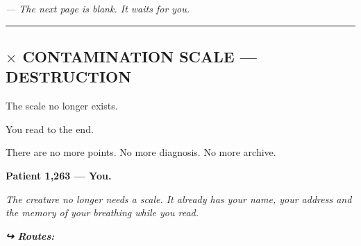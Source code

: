 \noindent \textit{--- The next page is blank. It waits for you.}

\vspace{0.5em}\noindent\rule{\textwidth}{0.5pt}\vspace{0.5em}

\subsection*{$\times$ CONTAMINATION SCALE --- DESTRUCTION}

\noindent The scale no longer exists.

\noindent You read to the end.

\noindent There are no more points. No more diagnosis. No more archive.

\noindent \textbf{Patient 1,263 --- You.}

\noindent \textit{The creature no longer needs a scale. It already has your name, your address and the memory of your breathing while you read.}

\vspace{0.5em}
\noindent\textit{\textbf{↪ Routes:}  \rotasep {} \rotasep {} \rotasep {}}
